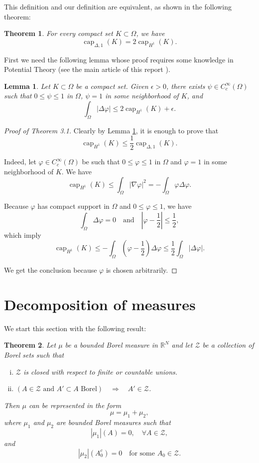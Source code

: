 \documentclass[a4paper, 11pt]{report}
\newtheorem{thm}{Theorem}[chapter]
\newtheorem{lmm}{Lemma}[chapter]
\theoremstyle{definition}\newtheorem*{rmk}{Remark}
\DeclareMathOperator{\capa}{cap}
\begin{document}
This definition and our definition are equivalent, as shown in the following theorem:

\begin{thm}
For every compact set $K \subset \Omega$, we have
\[
\capa_{\Delta, 1}(K) = 2 \capa_{H^1}(K).
\]
\end{thm}

First we need the following lemma whose proof requires some knowledge in Potential Theory (see the main article of this report \cite[Lemma E.1]{BMP}).

\begin{lmm}\label{caplmm}
Let $K \subset \Omega$ be a compact set. Given $\epsilon > 0$, there exists $\psi \in C_c^{\infty}(\Omega)$ such that $0\le \psi \le 1$ in $\Omega$, $\psi = 1$ in some neighborhood of $K$, and
\[
\int_{\Omega}|\Delta \varphi| \le 2 \capa_{H^1}(K) + \epsilon.
\]
\end{lmm}

\begin{proof}[Proof of Theorem 3.1]
Clearly by Lemma \ref{caplmm}, it is enough to prove that
\[
\capa_{H^1}(K) \le \frac{1}{2}\capa_{\Delta,1}(K).
\]

Indeed, let $\varphi \in C_c^{\infty}(\Omega)$ be such that $0\le \varphi \le 1$ in $\Omega$ and $\varphi = 1$ in some neighborhood of $K$. We have
\[
\capa_{H^1}(K) \le \int_{\Omega}|\nabla \varphi|^2 = -\int_{\Omega}\varphi \Delta \varphi.
\]

Because $\varphi$ has compact support in $\Omega$ and $0\le \varphi \le 1$, we have
\[
\int_{\Omega}\Delta \varphi = 0\quad\text{and} \quad |\varphi - \frac{1}{2}| \le \frac{1}{2},
\]
which imply
\[
\capa_{H^1}(K) \le -\int_{\Omega}(\varphi - \frac{1}{2})\Delta \varphi \le \frac{1}{2}\int_{\Omega}|\Delta \varphi|.
\]

We get the conclusion because $\varphi$ is chosen arbitrarily.
\end{proof}

\section{Decomposition of measures}
\mbox{}

We start this section with the following result:

\begin{thm}\label{33thm}
Let $\mu$ be a bounded Borel measure in $\mathbb{R}^N$ and let $\mathcal{Z}$ be a collection of Borel sets such that
\begin{enumerate}[i)]
\item $\mathcal{Z}$ is closed with respect to finite or countable unions.
\item $(A\in \mathcal{Z} \text{ and } A'\subset A \text{ Borel}) \quad \Rightarrow \quad A' \in \mathcal{Z}$.
\end{enumerate}
Then $\mu$ can be represented in the form
\[
\mu = \mu_1 + \mu_2,
\]
where $\mu_1$ and $\mu_2$ are bounded Borel measures such that
\[
|\mu_1|(A) = 0, \quad \forall A \in \mathcal{Z},
\]
and
\[
|\mu_2|(A_0^c) = 0 \quad \text{for some }A_0 \in \mathcal{Z}.
\]
\end{thm}
\end{document}

